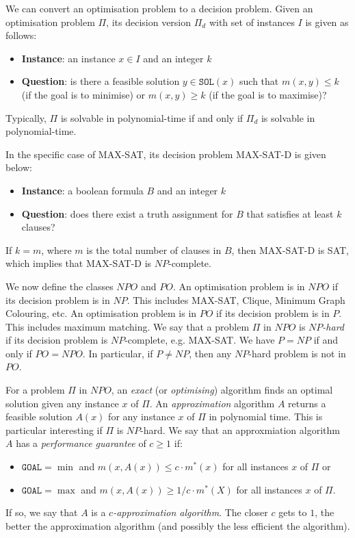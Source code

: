 \documentclass[a4paper, openany]{memoir}
\begin{document}
    We can convert an optimisation problem to a decision problem. Given an optimisation problem $\Pi$, its decision version $\Pi_d$ with set of instances $I$ is given as follows: 
    \begin{itemize}
        \item \textbf{Instance}: an instance $x \in I$ and an integer $k$
        \item \textbf{Question}: is there a feasible solution $y \in \texttt{SOL}(x)$ such that $m(x, y) \leq k$ (if the goal is to minimise) or $m(x, y) \geq k$ (if the goal is to maximise)?
    \end{itemize}
    Typically, $\Pi$ is solvable in polynomial-time if and only if $\Pi_d$ is solvable in polynomial-time.

    In the specific case of MAX-SAT, its decision problem MAX-SAT-D is given below:
    \begin{itemize}
        \item \textbf{Instance}: a boolean formula $B$ and an integer $k$
        \item \textbf{Question}: does there exist a truth assignment for $B$ that satisfies at least $k$ clauses?
    \end{itemize}
    If $k = m$, where $m$ is the total number of clauses in $B$, then MAX-SAT-D is SAT, which implies that MAX-SAT-D is $NP$-complete.

    We now define the classes $NPO$ and $PO$. An optimisation problem is in $NPO$ if its decision problem is in $NP$. This includes MAX-SAT, Clique, Minimum Graph Colouring, etc. An optimisation problem is in $PO$ if its decision problem is in $P$. This includes maximum matching. We say that a problem $\Pi$ in $NPO$ is \emph{$NP$-hard} if its decision problem is $NP$-complete, e.g. MAX-SAT. We have $P = NP$ if and only if $PO = NPO$. In particular, if $P \neq NP$, then any $NP$-hard problem is not in $PO$.

    For a problem $\Pi$ in $NPO$, an \emph{exact} (or \emph{optimising}) algorithm finds an optimal solution given any instance $x$ of $\Pi$. An \emph{approximation} algorithm $A$ returns a feasible solution $A(x)$ for any instance $x$ of $\Pi$ in polynomial time. This is particular interesting if $\Pi$ is $NP$-hard. We say that an approxmiation algorithm $A$ has a \emph{performance guarantee} of $c \geq 1$ if:
    \begin{itemize}
        \item $\texttt{GOAL} = \min$ and $m(x, A(x)) \leq c \cdot m^*(x)$ for all instances $x$ of $\Pi$ or
        \item $\texttt{GOAL} = \max$ and $m(x, A(x)) \geq 1/c \cdot m^*(X)$ for all instances $x$ of $\Pi$.
    \end{itemize}
    If so, we say that $A$ is a \emph{$c$-approximation algorithm}. The closer $c$ gets to $1$, the better the approximation algorithm (and possibly the less efficient the algorithm).
\end{document}
